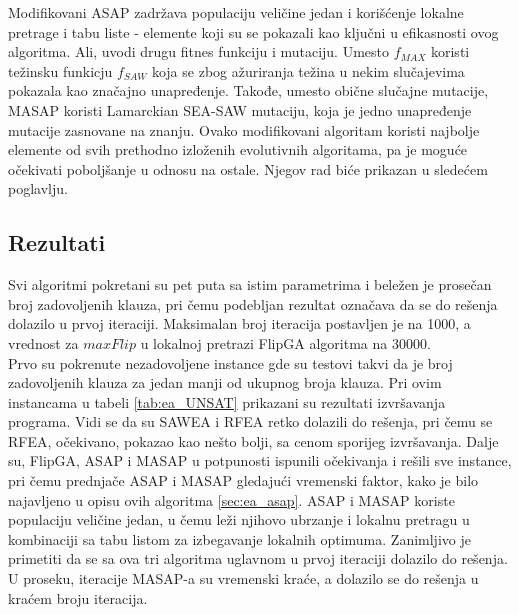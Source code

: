\documentclass[a4paper]{article}
\begin{document}
Modifikovani ASAP zadržava populaciju veličine jedan i korišćenje lokalne pretrage i tabu
liste - elemente koji su se pokazali kao ključni u efikasnosti ovog algoritma.
Ali, uvodi drugu fitnes funkciju i mutaciju. Umesto $f_{MAX}$ koristi težinsku funkicju
$f_{SAW}$ koja se zbog ažuriranja težina u nekim slučajevima pokazala kao značajno
unapređenje. Takođe, umesto obične slučajne mutacije, MASAP koristi Lamarckian SEA-SAW
mutaciju, koja je jedno unapređenje mutacije zasnovane na znanju.
Ovako modifikovani algoritam koristi najbolje elemente od svih prethodno izloženih 
evolutivnih algoritama, pa je moguće očekivati poboljšanje u odnosu na ostale. Njegov
rad biće prikazan u sledećem poglavlju.


\subsection{Rezultati}
\label{sec:ea_rezultati}
Svi algoritmi pokretani su pet puta sa istim parametrima i beležen je prosečan broj
zadovoljenih klauza, pri čemu podebljan rezultat označava da se do rešenja 
dolazilo u prvoj iteraciji. Maksimalan broj iteracija postavljen je na 1000, a vrednost
za $maxFlip$ u lokalnoj pretrazi FlipGA algoritma na 30000.\\

Prvo su pokrenute nezadovoljene instance gde su testovi takvi da je broj zadovoljenih klauza
za jedan manji od ukupnog broja klauza. Pri ovim instancama u tabeli \ref{tab:ea_UNSAT}
prikazani su rezultati izvršavanja programa. Vidi se da su SAWEA i RFEA retko dolazili
do rešenja, pri čemu se RFEA, očekivano, pokazao kao nešto bolji, sa cenom sporijeg
izvršavanja. Dalje su, FlipGA, ASAP i MASAP u potpunosti ispunili očekivanja i rešili sve
instance, pri čemu prednjače ASAP i MASAP gledajući vremenski faktor, 
kako je bilo najavljeno u opisu ovih  algoritma \ref{sec:ea_asap}. 
ASAP i MASAP koriste populaciju veličine jedan, u čemu leži njihovo
ubrzanje i lokalnu pretragu u kombinaciji sa tabu listom za izbegavanje lokalnih optimuma.
Zanimljivo je primetiti da se sa ova tri algoritma uglavnom u prvoj iteraciji dolazilo do 
rešenja. U proseku, iteracije MASAP-a su vremenski kraće, a dolazilo se do rešenja u 
kraćem broju iteracija.
\end{document}
